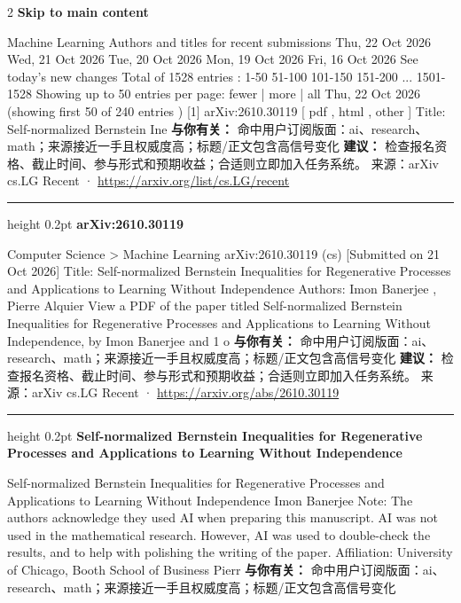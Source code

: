 \documentclass[10.5pt]{ctexart}
\begin{document}
\begin{multicols}{2}
{\large\bfseries Skip to main content}\par
Machine Learning Authors and titles for recent submissions Thu, 22 Oct 2026 Wed, 21 Oct 2026 Tue, 20 Oct 2026 Mon, 19 Oct 2026 Fri, 16 Oct 2026 See today's new changes Total of 1528 entries : 1-50 51-100 101-150 151-200 ... 1501-1528 Showing up to 50 entries per page: fewer | more | all Thu, 22 Oct 2026 (showing first 50 of 240 entries ) [1] arXiv:2610.30119 [ pdf , html , other ] Title: Self-normalized Bernstein Ine
\textbf{与你有关：} 命中用户订阅版面：ai、research、math；来源接近一手且权威度高；标题/正文包含高信号变化
\textbf{建议：} 检查报名资格、截止时间、参与形式和预期收益；合适则立即加入任务系统。
{\footnotesize\color{ormuted} 来源：arXiv cs.LG Recent · \url{https://arxiv.org/list/cs.LG/recent}}
\vspace{2mm}
\hrule height 0.2pt
\vspace{2mm}
{\large\bfseries arXiv:2610.30119}\par
Computer Science > Machine Learning arXiv:2610.30119 (cs) [Submitted on 21 Oct 2026] Title: Self-normalized Bernstein Inequalities for Regenerative Processes and Applications to Learning Without Independence Authors: Imon Banerjee , Pierre Alquier View a PDF of the paper titled Self-normalized Bernstein Inequalities for Regenerative Processes and Applications to Learning Without Independence, by Imon Banerjee and 1 o
\textbf{与你有关：} 命中用户订阅版面：ai、research、math；来源接近一手且权威度高；标题/正文包含高信号变化
\textbf{建议：} 检查报名资格、截止时间、参与形式和预期收益；合适则立即加入任务系统。
{\footnotesize\color{ormuted} 来源：arXiv cs.LG Recent · \url{https://arxiv.org/abs/2610.30119}}
\vspace{2mm}
\hrule height 0.2pt
\vspace{2mm}
{\large\bfseries Self-normalized Bernstein Inequalities for Regenerative Processes and Applications to Learning Without Independence}\par
Self-normalized Bernstein Inequalities for Regenerative Processes and Applications to Learning Without Independence Imon Banerjee Note: The authors acknowledge they used AI when preparing this manuscript. AI was not used in the mathematical research. However, AI was used to double-check the results, and to help with polishing the writing of the paper. Affiliation: University of Chicago, Booth School of Business Pierr
\textbf{与你有关：} 命中用户订阅版面：ai、research、math；来源接近一手且权威度高；标题/正文包含高信号变化

\end{multicols}
\end{document}
